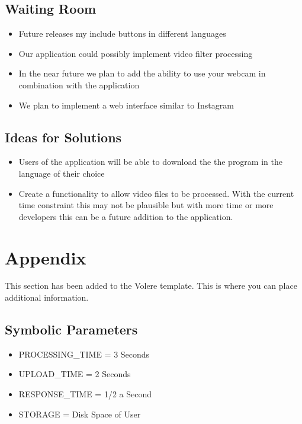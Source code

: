 \documentclass[12pt, titlepage]{article}
\begin{document}
\subsection{Waiting Room}

\begin{itemize}	
\item Future releases my include buttons in different languages
\item Our application could possibly implement video filter processing
\item In the near future we plan to add the ability to use your webcam in combination with the application
\item We plan to implement a web interface similar to Instagram
\end{itemize}

\subsection{Ideas for Solutions}

\begin{itemize}
\item Users of the application will be able to download the the program in the language of their choice
\item Create a functionality to allow video files to be processed. With the current time constraint this may not be plausible but with more time or more developers this can be a future addition to the application.
\end{itemize}







\newpage

\section{Appendix}

This section has been added to the Volere template.  This is where you can place
additional information.

\subsection{Symbolic Parameters}

\begin{itemize}
\item PROCESSING\_TIME = 3 Seconds
\item UPLOAD\_TIME = 2 Seconds
\item RESPONSE\_TIME = 1/2 a Second
\item STORAGE = Disk Space of User
\end{itemize}
\end{document}
